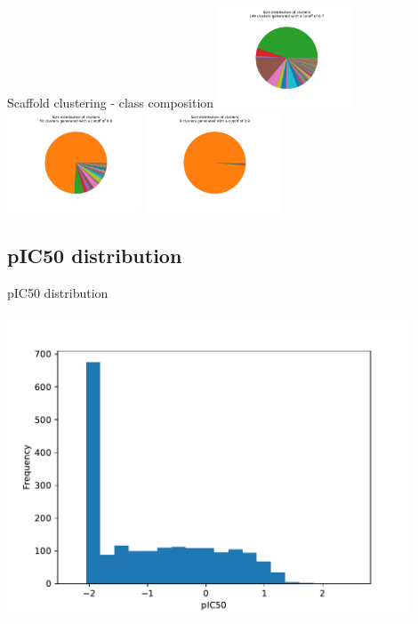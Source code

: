\documentclass{beamer}
\begin{document}
\begin{frame}{Scaffold clustering - class composition}
\includegraphics[width=0.3\textwidth]{../outputs/scaffold_clusters_0.7.pdf}
\includegraphics[width=0.3\textwidth]{../outputs/scaffold_clusters_0.8.pdf}
\includegraphics[width=0.3\textwidth]{../outputs/scaffold_clusters_0.9.pdf}
    
\end{frame}
    

\subsection{pIC50 distribution}
\begin{frame}{pIC50 distribution}

\includegraphics[width=0.9\textwidth]{../outputs/ic50_distribution.pdf}
    
\end{frame}
    
\end{document}
